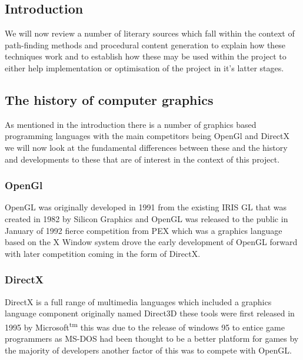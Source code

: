 
\setlength\parindent{0cm}

\subsection{Introduction}
We will now review a number of literary sources which fall within the context of path-finding methods and procedural content generation to explain how these techniques work and to establish how these may be used within the project to either help implementation or optimisation of the project in it's latter stages.  

\subsection{The history of computer graphics}
As mentioned  in the introduction there is a number of graphics based programming languages with the main competitors being OpenGl and DirectX we will now look at the fundamental differences between these and the history and developments to these that are of interest in the context of this project.

\subsubsection{OpenGl} 
OpenGL was originally developed in 1991 from the existing IRIS GL that was created in 1982 by Silicon Graphics and OpenGL was released to the public in January of 1992 \cite{OGL-History} fierce competition from PEX which was a graphics language based on the X Window system drove the early development of OpenGL forward with later competition coming in the form of DirectX.

\subsubsection{DirectX}    
DirectX is a full range of multimedia languages which included a graphics language component originally named Direct3D these tools were first released in 1995 by Microsoft\textsuperscript{tm} this was due to the release of windows 95 to entice game programmers as MS-DOS had been thought to be a better platform for games by the majority of developers another factor of this was to compete with OpenGL\cite{DirectXhistory}.    

